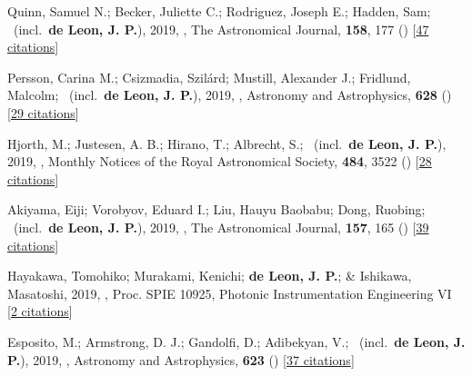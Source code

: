 \item[{\color{numcolor}\scriptsize15}] Quinn, Samuel N.; Becker, Juliette C.; Rodriguez, Joseph E.; Hadden, Sam; \etal\ (incl.\ \textbf{de Leon, J. P.}), 2019, , The Astronomical Journal, \textbf{158}, 177 () [\href{https://ui.adsabs.harvard.edu/abs/2019AJ....158..177Q}{47 citations}]

\item[{\color{numcolor}\scriptsize14}] Persson, Carina M.; Csizmadia, Szil{\'a}rd; Mustill, Alexander J.; Fridlund, Malcolm; \etal\ (incl.\ \textbf{de Leon, J. P.}), 2019, , Astronomy and Astrophysics, \textbf{628} () [\href{https://ui.adsabs.harvard.edu/abs/2019A&A...628A..64P}{29 citations}]

\item[{\color{numcolor}\scriptsize13}] Hjorth, M.; Justesen, A. B.; Hirano, T.; Albrecht, S.; \etal\ (incl.\ \textbf{de Leon, J. P.}), 2019, , Monthly Notices of the Royal Astronomical Society, \textbf{484}, 3522 () [\href{https://ui.adsabs.harvard.edu/abs/2019MNRAS.484.3522H}{28 citations}]

\item[{\color{numcolor}\scriptsize12}] Akiyama, Eiji; Vorobyov, Eduard I.; Liu, Hauyu Baobabu; Dong, Ruobing; \etal\ (incl.\ \textbf{de Leon, J. P.}), 2019, , The Astronomical Journal, \textbf{157}, 165 () [\href{https://ui.adsabs.harvard.edu/abs/2019AJ....157..165A}{39 citations}]

\item[{\color{numcolor}\scriptsize11}] Hayakawa, Tomohiko; Murakami, Kenichi; \textbf{de Leon, J. P.}; \& Ishikawa, Masatoshi, 2019, , Proc. SPIE 10925, Photonic Instrumentation Engineering VI [\href{https://www.spiedigitallibrary.org/conference-proceedings-of-spie/10925/1092507/Focus-adjustable-motion-blur-compensation-method-using-deformable-mirror/10.1117/12.2509567.short}{2 citations}]

\item[{\color{numcolor}\scriptsize10}] Esposito, M.; Armstrong, D. J.; Gandolfi, D.; Adibekyan, V.; \etal\ (incl.\ \textbf{de Leon, J. P.}), 2019, , Astronomy and Astrophysics, \textbf{623} () [\href{https://ui.adsabs.harvard.edu/abs/2019A&A...623A.165E}{37 citations}]

